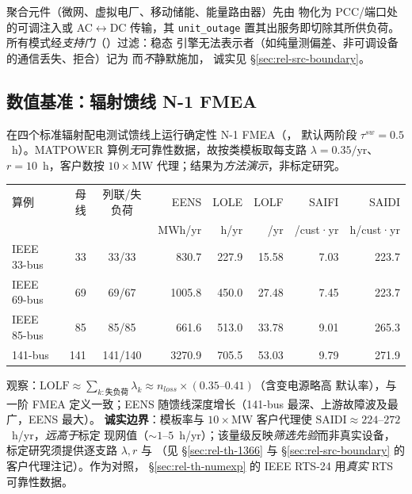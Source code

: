 聚合元件（微网、虚拟电厂、移动储能、能量路由器）先由
物化为 PCC/端口处的可调注入或 AC$\leftrightarrow$DC 传输，其 \texttt{unit\_outage} 置其出服务即切除其所供负荷。
所有模式经\emph{支持门}（）过滤：稳态
引擎无法表示者（如纯量测偏差、非可调设备的通信丢失、拒合）记为  而\emph{不}静默施加，
诚实见 \S\ref{sec:rel-src-boundary}。

\subsection{数值基准：辐射馈线 N-1 FMEA}\label{sec:rel-fa-bench}
在四个标准辐射配电测试馈线上运行确定性 N-1 FMEA（，
默认两阶段 $\tau^{sw}=0.5$~h）。MATPOWER 算例\emph{无}可靠性数据，故按类模板取每支路
$\lambda=0.35/\text{yr}$、$r=10$~h，客户数按 $10\times$MW 代理；结果为\emph{方法演示}，非标定研究。
\begin{center}\footnotesize
\begin{tabular}{@{}lrcrrrrr@{}}
\toprule
算例 & 母线 & 列联/失负荷 & EENS & LOLE & LOLF & SAIFI & SAIDI\\
 & & & \tiny MWh/yr & \tiny h/yr & \tiny /yr & \tiny /cust·yr & \tiny h/cust·yr\\
\midrule
IEEE 33-bus & 33 & 33/33 & 830.7 & 227.9 & 15.58 & 7.03 & 223.7\\
IEEE 69-bus & 69 & 69/67 & 1005.8 & 450.0 & 27.48 & 7.45 & 223.7\\
IEEE 85-bus & 85 & 85/85 & 661.6 & 513.0 & 33.78 & 9.01 & 265.3\\
141-bus & 141 & 141/140 & 3270.9 & 705.5 & 53.03 & 9.79 & 271.9\\
\bottomrule
\end{tabular}
\end{center}
观察：$\mathrm{LOLF}\approx\sum_{k:\text{失负荷}}\lambda_k\approx n_{loss}\times(0.35\text{–}0.41)$（含变电源略高
默认率），与一阶 FMEA 定义一致；EENS 随馈线深度增长（141-bus 最深、上游故障波及最广，EENS 最大）。
\textbf{诚实边界}：模板率与 $10\times$MW 客户代理使 $\mathrm{SAIDI}\approx224\text{–}272$~h/yr，\emph{远高于}标定
现网值（$\sim1$–$5$~h/yr）；该量级反映\emph{筛选先验}而非真实设备，标定研究须提供逐支路 $\lambda,r$ 与
（见 \S\ref{sec:rel-th-1366} 与 \S\ref{sec:rel-src-boundary} 的客户代理注记）。作为对照，
\S\ref{sec:rel-th-numexp} 的 IEEE RTS-24 用\emph{真实} RTS 可靠性数据。

